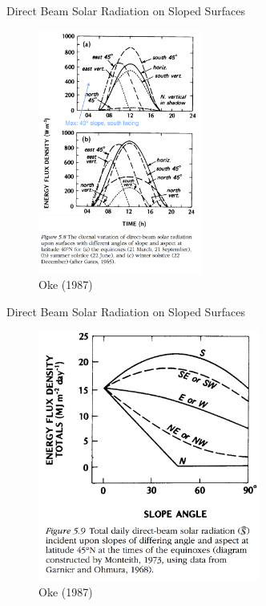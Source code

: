 \begin{frame}{Direct Beam Solar Radiation on Sloped Surfaces}
\begin{figure}
	\includegraphics[width=0.48\textwidth]{fig34.png}
	\centering \tiny~\\Oke (1987)
\end{figure}
\end{frame}


\begin{frame}{Direct Beam Solar Radiation on Sloped Surfaces}
\begin{figure}
	\includegraphics[width=0.65\textwidth]{fig35.png}
	\centering \tiny~\\Oke (1987)
\end{figure}
\end{frame}




